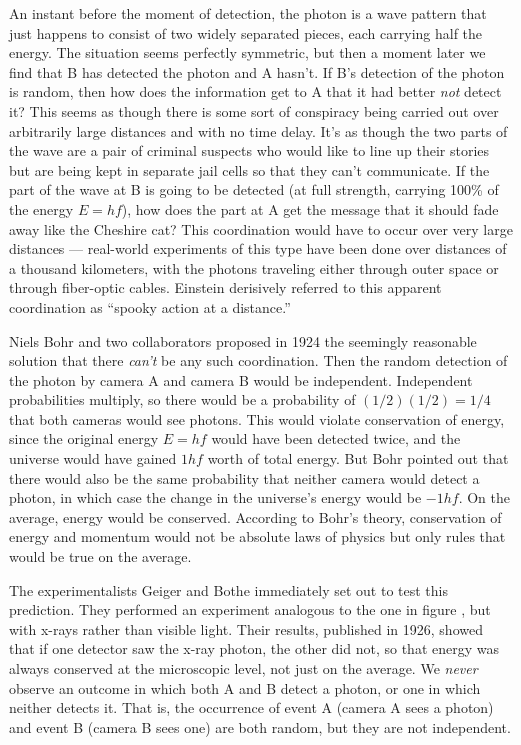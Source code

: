 \noindent An instant before the moment of detection, the photon is a
wave pattern that just happens to consist of two widely separated
pieces, each carrying half the energy.  The situation seems perfectly
symmetric, but then a moment later we find that B has detected the
photon and A hasn't. If B's detection of the photon is random, then
how does the information get to A that it had better \emph{not} detect
it?  This seems as though there is some sort of conspiracy being
carried out over arbitrarily large distances and with no time delay.
It's as though the two parts of the wave are a pair of criminal
suspects who would like to line up their stories but are being kept in
separate jail cells so that they can't communicate.  If the part of
the wave at B is going to be detected (at full strength, carrying
100\% of the energy $E=hf$), how does the part at A get the message
that it should fade away like the Cheshire cat?
This coordination would have to occur over very large distances ---
real-world experiments of this type have been done over distances of a
thousand kilometers, with the photons traveling either through outer
space or through fiber-optic cables.  Einstein derisively referred to
this apparent coordination as ``spooky action at a distance.''

Niels Bohr and two collaborators proposed in 1924 the
seemingly reasonable solution that there \emph{can't} be any such
coordination. Then the random detection of the photon by camera A
and camera B would be independent. Independent probabilities multiply,
so there would be a probability of $(1/2)(1/2)=1/4$ that both cameras
would see photons. This would violate conservation of energy, since
the original energy $E=hf$ would have been detected twice, and the universe
would have gained $1hf$ worth of total energy. But Bohr
pointed out that there would also be the same probability that neither
camera would detect a photon, in which case the change in the universe's
energy would be $-1hf$. On the average, energy would be conserved. According
to Bohr's theory, conservation of energy and momentum would not be absolute
laws of physics but only rules that would be true on the average.

The experimentalists Geiger and Bothe immediately set out to test this
prediction. They performed an experiment analogous to the one in
figure , but with x-rays rather than visible
light.  Their results, published in 1926, showed that if one detector
saw the x-ray photon, the other did not, so that energy was always
conserved at the microscopic level, not just on the average.
We \emph{never} observe an outcome in which both A and B
detect a photon, or one in which neither detects it. That is, the
occurrence of event A (camera A sees a photon) and event B (camera B
sees one) are both random, but they are not independent. 

